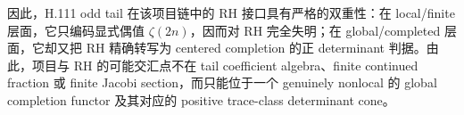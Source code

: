\noindent
因此，H.111 odd tail 在该项目链中的 RH 接口具有严格的双重性：在 local/finite 层面，它只编码显式偶值 \(\zeta(2n)\)，因而对 RH 完全失明；在 global/completed 层面，它却又把 RH 精确转写为 centered completion 的正 determinant 判据。由此，项目与 RH 的可能交汇点不在 tail coefficient algebra、finite continued fraction 或 finite Jacobi section，而只能位于一个 genuinely nonlocal 的 global completion functor 及其对应的 positive trace-class determinant cone。

\endinput
